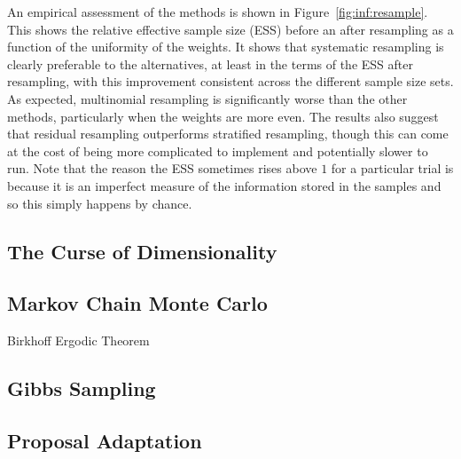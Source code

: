 An empirical assessment of the methods is shown in Figure~\ref{fig:inf:resample}.  This shows
the relative effective sample size (ESS) before an after resampling as a function of the uniformity of
the weights.  It shows that systematic resampling is clearly preferable to the alternatives, at least
in the terms of the ESS after resampling, with this improvement consistent across the different
sample size sets.  As expected, multinomial resampling is significantly worse than the other
methods, particularly when the weights are more even.  The results also suggest that residual
resampling outperforms stratified resampling, though this can come at the cost of being more
complicated to implement and potentially slower to run.  Note that the reason the ESS sometimes
rises above $1$ for a particular trial is because it is an imperfect measure of the information 
stored in the samples and so this simply happens by chance.

\subsection{The Curse of Dimensionality}
\label{sec:inf:foundation:curse}


\subsection{Markov Chain Monte Carlo}
\label{sec:inf:foundation:mcmc}

Birkhoff Ergodic Theorem

\subsection{Gibbs Sampling}
\label{sec:inf:foundation:gibbs}

\subsection{Proposal Adaptation}
\label{sec:inf:proposal-adapt}